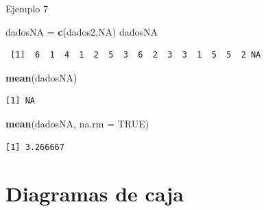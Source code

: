 \documentclass[
  ignorenonframetext,
]{beamer}
\newenvironment{Shaded}{\begin{snugshade}}{\end{snugshade}}
\newcommand{\DataTypeTok}[1]{\textcolor[rgb]{0.13,0.29,0.53}{#1}}
\newcommand{\KeywordTok}[1]{\textcolor[rgb]{0.13,0.29,0.53}{\textbf{#1}}}
\newcommand{\NormalTok}[1]{#1}
\newcommand{\OtherTok}[1]{\textcolor[rgb]{0.56,0.35,0.01}{#1}}
\newcommand{\StringTok}[1]{\textcolor[rgb]{0.31,0.60,0.02}{#1}}
\begin{document}
\begin{frame}[fragile]{Ejemplo 7}
\protect\hypertarget{ejemplo-7}{}

\begin{Shaded}
\begin{Highlighting}[]
\NormalTok{dadosNA =}\StringTok{ }\KeywordTok{c}\NormalTok{(dados2,}\OtherTok{NA}\NormalTok{)}
\NormalTok{dadosNA}
\end{Highlighting}
\end{Shaded}

\begin{verbatim}
 [1]  6  1  4  1  2  5  3  6  2  3  3  1  5  5  2 NA
\end{verbatim}

\begin{Shaded}
\begin{Highlighting}[]
\KeywordTok{mean}\NormalTok{(dadosNA)}
\end{Highlighting}
\end{Shaded}

\begin{verbatim}
[1] NA
\end{verbatim}

\begin{Shaded}
\begin{Highlighting}[]
\KeywordTok{mean}\NormalTok{(dadosNA, }\DataTypeTok{na.rm =} \OtherTok{TRUE}\NormalTok{)}
\end{Highlighting}
\end{Shaded}

\begin{verbatim}
[1] 3.266667
\end{verbatim}

\end{frame}

\hypertarget{diagramas-de-caja}{%
\section{Diagramas de caja}\label{diagramas-de-caja}}
\end{document}
